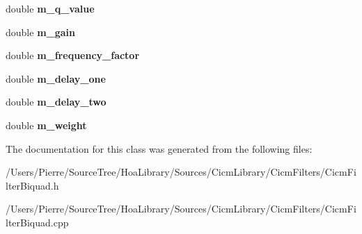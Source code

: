 \begin{DoxyCompactItemize}
\item 
\hypertarget{class_filter_biquad_a5eff2823d20f29a31ae45cc5067da89e}{double {\bfseries m\-\_\-q\-\_\-value}}\label{class_filter_biquad_a5eff2823d20f29a31ae45cc5067da89e}

\item 
\hypertarget{class_filter_biquad_a5935bdad525e5042b5b00276e8489389}{double {\bfseries m\-\_\-gain}}\label{class_filter_biquad_a5935bdad525e5042b5b00276e8489389}

\item 
\hypertarget{class_filter_biquad_a91b11330329bdd044579408083fbe43b}{double {\bfseries m\-\_\-frequency\-\_\-factor}}\label{class_filter_biquad_a91b11330329bdd044579408083fbe43b}

\item 
\hypertarget{class_filter_biquad_ac187ca5d40829293822495cc8d3f8c0a}{double {\bfseries m\-\_\-delay\-\_\-one}}\label{class_filter_biquad_ac187ca5d40829293822495cc8d3f8c0a}

\item 
\hypertarget{class_filter_biquad_afdfc9eb2ae66b50700ae6ed74534fa18}{double {\bfseries m\-\_\-delay\-\_\-two}}\label{class_filter_biquad_afdfc9eb2ae66b50700ae6ed74534fa18}

\item 
\hypertarget{class_filter_biquad_ac5b9977a216c858bd8e369349d830881}{double {\bfseries m\-\_\-weight}}\label{class_filter_biquad_ac5b9977a216c858bd8e369349d830881}

\end{DoxyCompactItemize}


The documentation for this class was generated from the following files\-:\begin{DoxyCompactItemize}
\item 
/\-Users/\-Pierre/\-Source\-Tree/\-Hoa\-Library/\-Sources/\-Cicm\-Library/\-Cicm\-Filters/Cicm\-Filter\-Biquad.\-h\item 
/\-Users/\-Pierre/\-Source\-Tree/\-Hoa\-Library/\-Sources/\-Cicm\-Library/\-Cicm\-Filters/Cicm\-Filter\-Biquad.\-cpp\end{DoxyCompactItemize}
